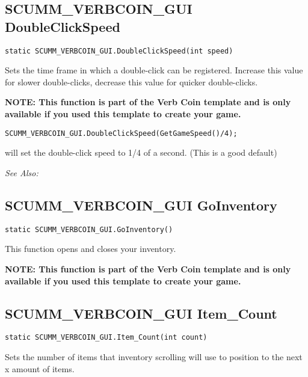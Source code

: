 \subsection{SCUMM_VERBCOIN_GUI DoubleClickSpeed}\label{SCUMM_VERBCOIN_GUI.DoubleClickSpeed}%

\begin{verbatim}
static SCUMM_VERBCOIN_GUI.DoubleClickSpeed(int speed)
\end{verbatim}
Sets the time frame in which a double-click can be registered. Increase this value
for slower double-clicks, decrease this value for quicker double-clicks.

\bf{NOTE:} This function is part of the Verb Coin template and is only available if
you used this template to create your game.

\begin{verbatim}
SCUMM_VERBCOIN_GUI.DoubleClickSpeed(GetGameSpeed()/4);
\end{verbatim}

will set the double-click speed to 1/4 of a second. (This is a good default)

\it{See Also:} 


\subsection{SCUMM_VERBCOIN_GUI GoInventory}\label{SCUMM_VERBCOIN_GUI.GoInventory}%

\begin{verbatim}
static SCUMM_VERBCOIN_GUI.GoInventory()
\end{verbatim}
This function opens and closes your inventory.

\bf{NOTE:} This function is part of the Verb Coin template and is only available if
you used this template to create your game.


\subsection{SCUMM_VERBCOIN_GUI Item_Count}\label{SCUMM_VERBCOIN_GUI.Item_Count}%

\begin{verbatim}
static SCUMM_VERBCOIN_GUI.Item_Count(int count)
\end{verbatim}
Sets the number of items that inventory scrolling will use to position to the next x amount of items.

